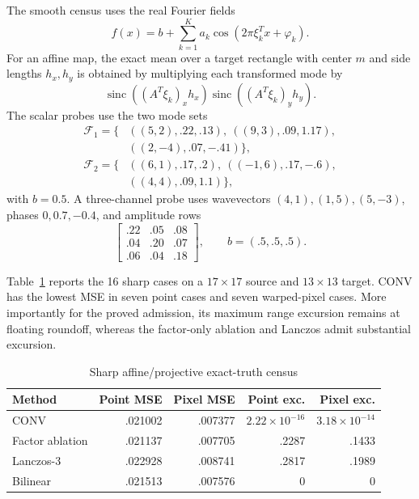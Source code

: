 The smooth census uses the real Fourier fields
\begin{equation}
 f(x)=b+\sum_{k=1}^Ka_k
 \cos\!\left(2\pi\xi_k^Tx+\varphi_k\right).
 \label{eq:warpfourierfield}
\end{equation}
For an affine map, the exact mean over a target rectangle with center \(m\)
and side lengths \(h_x,h_y\) is obtained by multiplying each transformed
mode by
\begin{equation}
 \operatorname{sinc}((A^T\xi_k)_xh_x)
 \operatorname{sinc}((A^T\xi_k)_yh_y).
 \label{eq:warpfouriermean}
\end{equation}
The scalar probes use the two mode sets
\begin{equation}
\begin{aligned}
 \mathcal F_1=\{&((5,2),.22,.13),\ ((9,3),.09,1.17),\\
                &((2,-4),.07,-.41)\},\\
 \mathcal F_2=\{&((6,1),.17,.2),\ ((-1,6),.17,-.6),\\
                &((4,4),.09,1.1)\},
\end{aligned}
\label{eq:warpfourierprobes}
\end{equation}
with \(b=0.5\).  A three-channel probe uses wavevectors
\((4,1),(1,5),(5,-3)\), phases \(0,0.7,-0.4\), and amplitude rows
\begin{equation}
 \begin{bmatrix}.22&.05&.08\\.04&.20&.07\\.06&.04&.18\end{bmatrix},
 \qquad b=(.5,.5,.5).
 \label{eq:warpmultichannelprobe}
\end{equation}

Table~\ref{tab:warpsharp} reports the 16 sharp cases on a
\(17\times17\) source and \(13\times13\) target.  CONV has the lowest MSE in
seven point cases and seven warped-pixel cases.  More importantly for the
proved admission, its maximum range excursion remains at floating roundoff,
whereas the factor-only ablation and Lanczos admit substantial excursion.

\begin{table}[H]
\caption{Sharp affine/projective exact-truth census}
\label{tab:warpsharp}
\centering
\scriptsize
\setlength{\tabcolsep}{2.0pt}
\begin{tabular}{lrrrr}
\hline
Method & Point MSE & Pixel MSE & Point exc. & Pixel exc.\\
\hline
CONV & .021002 & .007377 & \(2.22\!\times\!10^{-16}\) & \(3.18\!\times\!10^{-14}\)\\
Factor ablation & .021137 & .007705 & .2287 & .1433\\
Lanczos-3 & .022928 & .008741 & .2817 & .1989\\
Bilinear & .021513 & .007576 & 0 & 0\\
\hline
\end{tabular}
\end{table}

